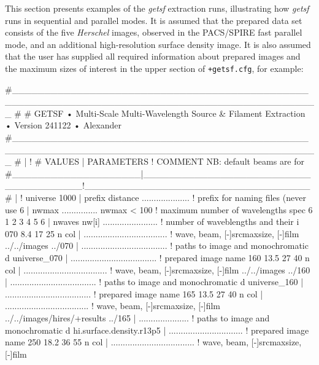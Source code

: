 \documentclass[a4paper,10pt]{article}
\begin{document}
This section presents examples of the \textsl{getsf} extraction runs, illustrating how \textsl{getsf} runs in sequential and
parallel modes. It is assumed that the prepared data set consists of the five \emph{Herschel} images, observed in the PACS/SPIRE
fast parallel mode, and an additional high-resolution surface density image. It is also assumed that the user has supplied all
required information about prepared images and the maximum sizes of interest in the upper section of \verb!+getsf.cfg!, for example:
\begin{verbnobox}[\mbox{}\small]
#_______________________________________________________________________________________________
#                                                                                               
# GETSF • Multi-Scale Multi-Wavelength Source & Filament Extraction • Version 241122 • Alexander
#_______________________________________________________________________________________________
#                    |                                      !
# VALUES             | PARAMETERS                           ! COMMENT  NB: default beams are for
#____________________|______________________________________!___________________________________
#                    |                                      !
 universe 1000       | prefix distance .................... ! prefix for naming files (never use
 6                   | nwmax ...............{ nwmax < 100 } ! maximum number of wavelengths spec
 6 1 2 3 4 5 6       | nwaves nw[i] ....................... ! number of waveblengths and their i
 070  8.4 17 25 n col | ................................... ! wave, beam, [-]srcmaxsize, [-]film
 ../../images ../070 | .................................... ! paths to image and monochromatic d
 universe_070        | .................................... ! prepared image name
 160 13.5 27 40 n col | ................................... ! wave, beam, [-]srcmaxsize, [-]film
 ../../images ../160 | .................................... ! paths to image and monochromatic d
 universe_160        | .................................... ! prepared image name
 165 13.5 27 40 n col | ................................... ! wave, beam, [-]srcmaxsize, [-]film
 ../../images/hires/+results ../165 | ..................... ! paths to image and monochromatic d
 hi.surface.density.r13p5 | ............................... ! prepared image name
 250 18.2 36 55 n col | ................................... ! wave, beam, [-]srcmaxsize, [-]film

\end{verbnobox}
\end{document}
